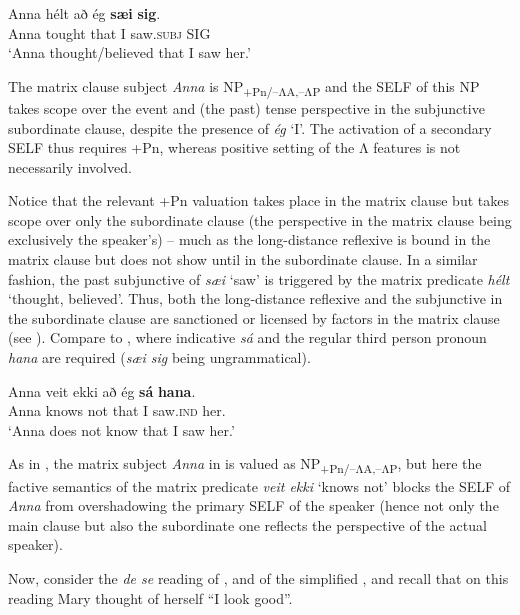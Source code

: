 \documentclass[output=paper]{LSP/langsci}
\begin{document}
\ea%
    \label{ex:Sigurdsson:36}
\gll	  Anna  hélt  að  ég  \textbf{sæi}  \textbf{sig}.\\
Anna  tought  that  I  saw.\textsc{subj}  SIG \\
\glt ‘Anna thought/believed that I saw her.’
\z

The matrix clause subject \textit{Anna} is NP\textsubscript{+Pn/–ΛA,–ΛP} and the SELF of this NP takes scope over the event and (the past) tense perspective in the subjunctive subordinate clause, despite the presence of \textit{ég} ‘I’. The activation of a secondary SELF thus requires +Pn, whereas positive setting of the Λ features is not necessarily involved.

  Notice that the relevant +Pn valuation takes place in the matrix clause but takes scope over only the subordinate clause (the perspective in the matrix clause being exclusively the speaker’s) – much as the long-distance reflexive is bound in the matrix clause but does not show until in the subordinate clause. In a similar fashion, the past subjunctive of \textit{sæi} ‘saw’ is triggered by the matrix predicate \textit{hélt} ‘thought, believed’. Thus, both the long-distance reflexive and the subjunctive in the subordinate clause are sanctioned or licensed by factors in the matrix clause (see \citealt{Thráinsson1976,Thráinsson2007,Sigurðsson2010mood}). Compare  to , where indicative \textit{sá} and the regular third person pronoun \textit{hana} are required (\textit{sæi sig} being ungrammatical).

\ea%
    \label{ex:Sigurdsson:37}
  \gll	  Anna  veit  ekki  að  ég  \textbf{sá}  \textbf{hana}.\\
  Anna  knows  not  that  I  saw.\textsc{ind}  her.\\
\glt   ‘Anna does not know that I saw her.’
\z

As in , the matrix subject \textit{Anna} in  is valued as NP\textsubscript{+Pn/–ΛA,–ΛP}, but here the factive semantics of the matrix predicate \textit{veit ekki} ‘knows not’ blocks the SELF of \textit{Anna} from overshadowing the primary SELF of the speaker (hence not only the main clause but also the subordinate one reflects the perspective of the actual speaker).

Now, consider the \textit{de se} reading of , and of the simplified , and recall that on this reading Mary thought of herself “I look good”.
\end{document}
